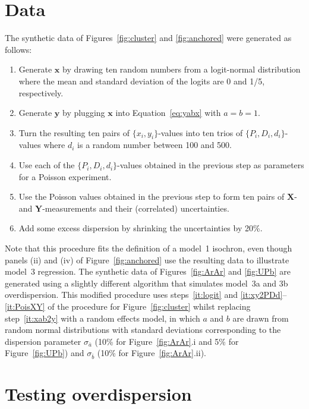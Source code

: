 \documentclass{article}
\begin{document}
\section{Data}\label{app:syntheticdata}

The synthetic data of Figures~\ref{fig:cluster} and \ref{fig:anchored}
were generated as follows:
\begin{enumerate}
\item Generate $\mathbf{x}$ by drawing ten random numbers from a
  logit-normal distribution where the mean and standard deviation of
  the logits are 0 and 1/5, respectively.\label{it:logit}
\item Generate $\mathbf{y}$ by plugging $\mathbf{x}$ into
  Equation~\ref{eq:yabx} with $a=b=1$.\label{it:xab2y}
\item Turn the resulting ten pairs of $\{x_i,y_i\}$-values into ten
  trios of $\{P_i,D_i,d_i\}$-values where $d_i$ is a random number
  between 100 and 500.\label{it:xy2PDd}
\item Use each of the $\{P_i,D_i,d_i\}$-values obtained in the
  previous step as parameters for a Poisson experiment.
\item Use the Poisson values obtained in the previous step to form ten
  pairs of $\mathbf{X}$- and $\mathbf{Y}$-measurements and their
  (correlated) uncertainties.\label{it:PoisXY}
\item Add some excess dispersion by shrinking the uncertainties by
  20\%.
\end{enumerate}

Note that this procedure fits the definition of a model~1 isochron,
even though panels (ii) and (iv) of Figure~\ref{fig:anchored} use the
resulting data to illustrate model~3 regression. The synthetic data of
Figures~\ref{fig:ArAr} and \ref{fig:UPb} are generated using a
slightly different algorithm that simulates model~3a and 3b
overdispersion. This modified procedure uses steps~\ref{it:logit} and
\ref{it:xy2PDd}--\ref{it:PoisXY} of the procedure for
Figure~\ref{fig:cluster} whilst replacing step~\ref{it:xab2y} with a
random effects model, in which $a$ and $b$ are drawn from random normal
distributions with standard deviations corresponding to the dispersion
parameter $\sigma_{\bar{a}}$ (10\% for Figure~\ref{fig:ArAr}.i and 5\%
for Figure~\ref{fig:UPb}) and $\sigma_{\bar{b}}$ (10\% for
Figure~\ref{fig:ArAr}.ii).

\section{Testing overdispersion}\label{app:X2}
\end{document}
